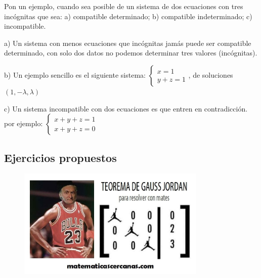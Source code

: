 \begin{ejre}
	Pon un ejemplo, cuando sea posible de un sistema de dos ecuaciones con tres incógnitas que sea: a) compatible determinado; b) compatible indeterminado; c) incompatible.
\end{ejre}
\begin{proofw}\renewcommand{\qedsymbol}{$\diamond$}
	
	\noindent a) Un sistema con menos ecuaciones que incógnitas jamás puede ser compatible determinado, con solo dos datos no podemos determinar tres valores (incógnitas).
	
	\noindent b) Un ejemplo sencillo es el siguiente sistema: $\begin{cases} x=1 \\y+z=1 \end{cases}$, de soluciones $(1,-\lambda,\lambda)$
	
	\noindent c) Un sistema incompatible con dos ecuaciones es que entren en contradicción. por ejemplo: $\begin{cases}x+y+z=1\\x+y+z=0\end{cases}$
\end{proofw}


\subsection{Ejercicios propuestos}
	\begin{figure}[H]
		\centering
		\includegraphics[width=0.8\textwidth]{imagenes/imagenes01/T01IM03.png}
	\end{figure}

